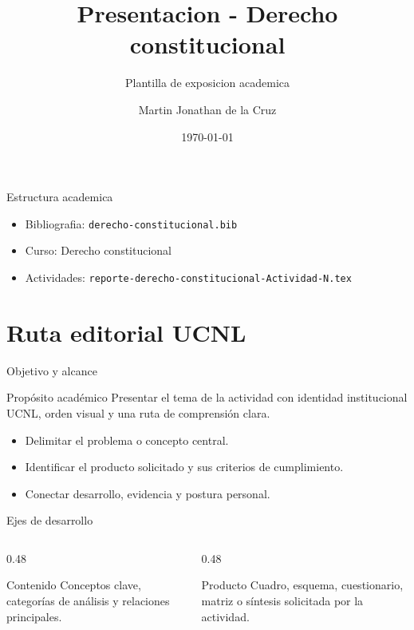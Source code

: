 ﻿\documentclass[spanish,aspectratio=169]{beamer}
\title{Presentacion - Derecho constitucional}
\subtitle{Plantilla de exposicion academica}
\author{Martin Jonathan de la Cruz}
\institute{Universidad Ciudadana de Nuevo Leon}
\date{\today}
\begin{document}
\begin{frame}
  \titlepage
\end{frame}

\begin{frame}{Estructura academica}
  \begin{itemize}
    \item Bibliografia: \texttt{derecho-constitucional.bib}
    \item Curso: Derecho constitucional
    \item Actividades: \texttt{reporte-derecho-constitucional-Actividad-N.tex}
  \end{itemize}
\end{frame}


\section{Ruta editorial UCNL}

\begin{frame}{Objetivo y alcance}
  \begin{block}{Propósito académico}
    Presentar el tema de la actividad con identidad institucional UCNL, orden visual y una ruta de comprensión clara.
  \end{block}
  \begin{itemize}
    \item Delimitar el problema o concepto central.
    \item Identificar el producto solicitado y sus criterios de cumplimiento.
    \item Conectar desarrollo, evidencia y postura personal.
  \end{itemize}
\end{frame}

\begin{frame}{Ejes de desarrollo}
  \begin{columns}[T,totalwidth=\textwidth]
    \begin{column}{0.48\textwidth}
      \begin{block}{Contenido}
        Conceptos clave, categorías de análisis y relaciones principales.
      \end{block}
    \end{column}
    \begin{column}{0.48\textwidth}
      \begin{block}{Producto}
        Cuadro, esquema, cuestionario, matriz o síntesis solicitada por la actividad.
      \end{block}
    \end{column}
  \end{columns}
\end{frame}
\end{document}
